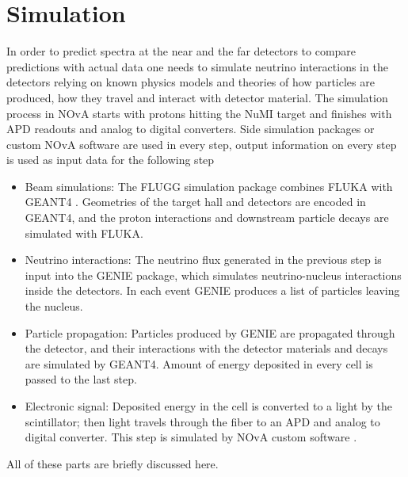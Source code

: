 \chapter{Simulation}
\label{simulation_chapter}

In order to predict spectra at the near and the far detectors to compare predictions with
actual data one needs to simulate neutrino interactions in the detectors relying on
known physics models and theories of how particles are produced, how they travel and interact
with detector material. The simulation process in NOvA starts with protons hitting
the NuMI target and finishes with APD readouts and analog to digital converters. Side simulation
packages or custom NOvA software are used in every step, output information on every step is
used as input data for the following step
\begin{itemize}
\item Beam simulations: The FLUGG simulation package combines FLUKA \cite{FLUKA} with GEANT4 \cite{GEANT4}.
Geometries of the target hall and detectors are encoded in GEANT4, and the proton interactions
and downstream particle decays are simulated with FLUKA.
\item Neutrino interactions: The neutrino flux generated in the previous step is input into
the GENIE \cite{GENIE} package, which simulates neutrino-nucleus interactions inside the
detectors. In each event GENIE produces a list of particles leaving the nucleus.
\item Particle propagation: Particles produced by GENIE are propagated through the detector,
and their interactions with the detector materials and decays are simulated by GEANT4. Amount of
energy deposited in every cell is passed to the last step.
\item Electronic signal: Deposited energy in the cell is converted to a light by the scintillator;
then light travels through the fiber to an APD and analog to digital converter. This step is
simulated by NOvA custom software \cite{NovaSim}.
\end{itemize}
All of these parts are briefly discussed here.

